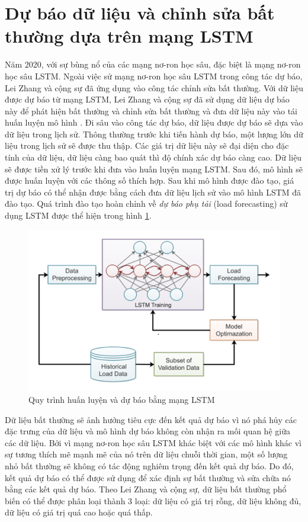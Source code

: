 \section{Dự báo dữ liệu và chỉnh sửa bất thường dựa trên mạng LSTM}
Năm 2020, với sự bùng nổ của các mạng nơ-ron học sâu, đặc biệt là mạng nơ-ron học sâu LSTM. Ngoài việc sử mạng nơ-ron học sâu LSTM trong công tác dự báo, Lei Zhang và cộng sự đã ứng dụng vào công tác chỉnh sửa bất thường. Với dữ liệu được dự báo từ mạng LSTM, Lei Zhang và cộng sự đã sử dụng dữ liệu dự báo này để phát hiện bất thường và chỉnh sửa bất thường và đưa dữ liệu này vào tái huấn luyện mô hình \cite{st31}.
Đi sâu vào công tác dự báo, dữ liệu được dự báo sẽ dựa vào dữ liệu trong lịch sử. Thông thường trước khi tiến hành dự báo, một lượng lớn dữ liệu trong lịch sử sẽ được thu thập. Các giá trị dữ liệu này sẽ đại diện cho đặc tính của dữ liệu, dữ liệu càng bao quát thì độ chính xác dự báo càng cao. Dữ liệu sẽ được tiền xử lý trước khi đưa vào huấn luyện mạng LSTM. Sau đó, mô hình sẽ được huấn luyện với các thông số thích hợp. Sau khi mô hình được đào tạo, giá trị dự báo có thể nhận được bằng cách đưa dữ liệu lịch sử vào mô hình LSTM đã đào tạo. Quá trình đào tạo hoàn chỉnh về \textit{dự báo phụ tải} (load forecasting) sử dụng LSTM được thể hiện trong hình \ref{fig:3-11}.

\begin{figure}[H]
    \centering
    \includegraphics[scale=0.95]{./content/images/3-11.png}
    \caption{Quy trình huấn luyện và dự báo bằng mạng LSTM \cite{st31}}
    \label{fig:3-11}
\end{figure}

Dữ liệu bất thường sẽ ảnh hưởng tiêu cực đến kết quả dự báo vì nó phá hủy các đặc trưng của dữ liệu và mô hình dự báo không còn nhận ra mối quan hệ giữa các dữ liệu. Bởi vì mạng nơ-ron học sâu LSTM khác biệt với các mô hình khác vì sự tương thích mẽ mạnh mẽ của nó trên dữ liệu chuỗi thời gian, một số lượng nhỏ bất thường sẽ không có tác động nghiêm trọng đến kết quả dự báo. Do đó, kết quả dự báo có thể được sử dụng để xác định sự bất thường và sửa chữa nó bằng các kết quả dự báo. Theo Lei Zhang và cộng sự, dữ liệu bất thường phổ biến có thể được phân loại thành 3 loại: dữ liệu có giá trị rỗng, dữ liệu không đủ, dữ liệu có giá trị quá cao hoặc quá thấp.

